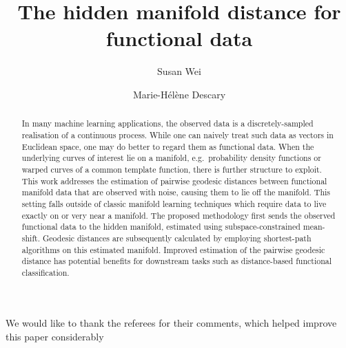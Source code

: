 \documentclass{ecai}
\begin{document}
\title{The hidden manifold distance for functional data}

\author{Susan Wei \and Marie-H\'el\`{e}ne Descary}

\maketitle



\begin{abstract}
In many machine learning applications, the observed data is a
discretely-sampled realisation of a continuous process. While one can
naively treat such data as vectors in Euclidean space, one may do better
to regard them as functional data.  
When the underlying curves of interest lie on a manifold, e.g.~probability density
functions or warped curves of a common template function, there is further structure to exploit. 
This work addresses the estimation of pairwise geodesic
distances between functional manifold data that are observed with noise,
causing them to lie off the manifold. This setting falls outside of
classic manifold learning techniques which require data to live exactly
on or very near a manifold. The proposed methodology first sends the
observed functional data to the hidden manifold, estimated using
subspace-constrained mean-shift. Geodesic distances are subsequently
calculated by employing shortest-path algorithms on this estimated
manifold. Improved estimation of the pairwise geodesic distance has
potential benefits for downstream tasks such as distance-based functional classification.
\end{abstract}







\ack We would like to thank the referees for their comments, which
helped improve this paper considerably

\newpage


\end{document}
